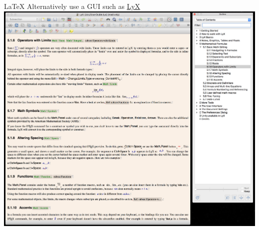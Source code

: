 \documentclass{beamer} %
\begin{document}
  \begin{frame}{\LaTeX}
    Alternatively use a GUI such as \href{https://www.lyx.org/}{LyX}
    \\
    \includegraphics[height=\textheight]{lyx.png}
  \end{frame}
  
\end{document}
